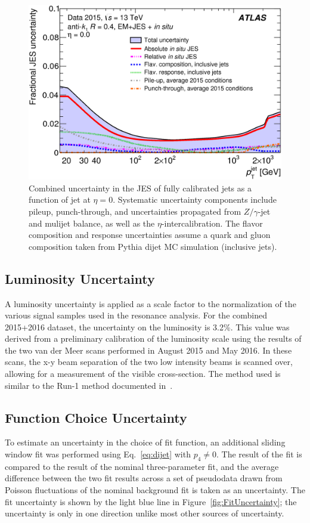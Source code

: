 \begin{figure}[ht!]
	\centering
	\includegraphics[width=0.7\columnwidth]{figures/Results/JES_Uncertainty.png}
	\caption{Combined uncertainty in the JES of fully calibrated jets as a function of jet \pt at $\eta=0$.  Systematic uncertainty components include pileup, punch-through, and uncertainties propagated from $Z/\gamma$-jet and mulijet balance, as well as the $\eta$-intercalibration.  The flavor composition and response uncertainties assume a quark and gluon composition taken from Pythia dijet MC simulation (inclusive jets).}
	\label{fig:JES_Uncertainty}
\end{figure}

\subsection{Luminosity Uncertainty}
A luminosity uncertainty is applied as a scale factor to the normalization of the various signal samples used in the resonance analysis.  For the combined 2015+2016 dataset, the uncertainty on the luminosity is 3.2\%.  This value was derived from a preliminary calibration of the luminosity scale using the results of the two van der Meer scans performed in August 2015 and May 2016.  In these scans, the x-y beam separation of the two low intensity beams is scanned over, allowing for a measurement of the visible cross-section.  The method used is similar to the Run-1 method documented in~\cite{Luminosity}.

\subsection{Function Choice Uncertainty}
To estimate an uncertainty in the choice of fit function, an additional sliding window fit was performed using Eq.~\ref{eq:dijet} with $p_4\neq0$.  The result of the fit is compared to the result of the nominal three-parameter fit, and the average difference between the two fit results across a set of pseudodata drawn from Poisson fluctuations of the nominal background fit is taken as an uncertainty.  The fit uncertainty is shown by the light blue line in Figure~\ref{fig:FitUncertainty}; the uncertainty is only in one direction unlike most other sources of uncertainty.

